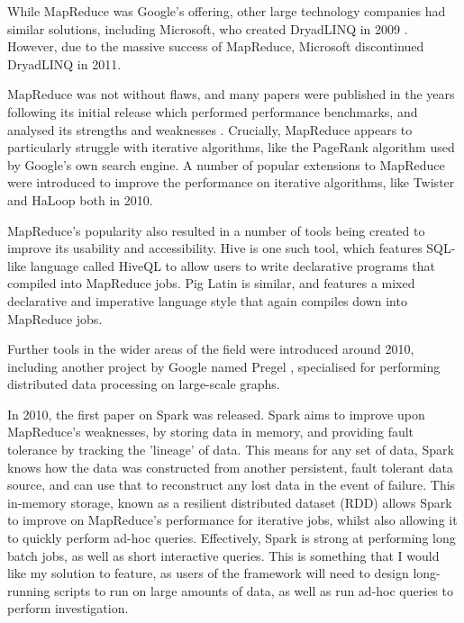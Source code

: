 While MapReduce was Google's offering, other large technology companies had similar solutions, including Microsoft, who created DryadLINQ in 2009 \cite{fetterly2009dryadlinq}. However, due to the massive success of MapReduce, Microsoft discontinued DryadLINQ in 2011.

MapReduce was not without flaws, and many papers were published in the years following its initial release which performed performance benchmarks, and analysed its strengths and weaknesses \cite{lee2012parallel}. Crucially, MapReduce appears to particularly struggle with iterative algorithms, like the PageRank algorithm used by Google's own search engine. A number of popular extensions to MapReduce were introduced to improve the performance on iterative algorithms, like Twister \cite{ekanayake2010twister} and HaLoop \cite{bu2010haloop} both in 2010. 

MapReduce's popularity also resulted in a number of tools being created to improve its usability and accessibility. Hive \cite{thusoo2010hive} is one such tool, which features SQL-like language called HiveQL to allow users to write declarative programs that compiled into MapReduce jobs. Pig Latin \cite{olston2008pig} is similar, and features a mixed declarative and imperative language style that again compiles down into MapReduce jobs. 

Further tools in the wider areas of the field were introduced around 2010, including another project by Google named Pregel \cite{malewicz2010pregel}, specialised for performing distributed data processing on large-scale graphs.

In 2010, the first paper on Spark \cite{zaharia2010spark} was released. Spark aims to improve upon MapReduce's weaknesses, by storing data in memory, and providing fault tolerance by tracking the 'lineage' of data. This means for any set of data, Spark knows how the data was constructed from another persistent, fault tolerant data source, and can use that to reconstruct any lost data in the event of failure. This in-memory storage, known as a resilient distributed dataset (RDD) \cite{zaharia2012rdd} allows Spark to improve on MapReduce's performance for iterative jobs, whilst also allowing it to quickly perform ad-hoc queries.  Effectively, Spark is strong at performing long batch jobs, as well as short interactive queries. This is something that I would like my solution to feature, as users of the framework will need to design long-running scripts to run on large amounts of data, as well as run ad-hoc queries to perform investigation.

